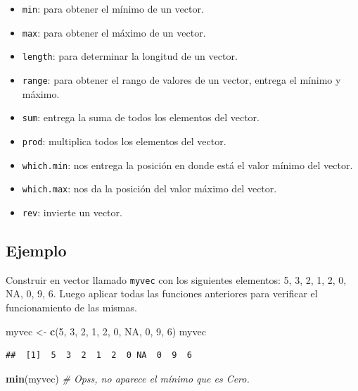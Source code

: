 \documentclass[10pt,]{krantz}
\makeatletter
\newenvironment{Shaded}{\begin{snugshade}}{\end{snugshade}}
\newcommand{\KeywordTok}[1]{\textcolor[rgb]{0.13,0.29,0.53}{\textbf{{#1}}}}
\newcommand{\DecValTok}[1]{\textcolor[rgb]{0.00,0.00,0.81}{{#1}}}
\newcommand{\StringTok}[1]{\textcolor[rgb]{0.31,0.60,0.02}{{#1}}}
\newcommand{\CommentTok}[1]{\textcolor[rgb]{0.56,0.35,0.01}{\textit{{#1}}}}
\newcommand{\OtherTok}[1]{\textcolor[rgb]{0.56,0.35,0.01}{{#1}}}
\newcommand{\NormalTok}[1]{{#1}}
\providecommand{\tightlist}{%
  \setlength{\itemsep}{0pt}\setlength{\parskip}{0pt}}
\newenvironment{kframe}{%
\medskip{}
\setlength{\fboxsep}{.8em}
 \def\at@end@of@kframe{}%
 \ifinner\ifhmode%
  \def\at@end@of@kframe{\end{minipage}}%
  \begin{minipage}{\columnwidth}%
 \fi\fi%
 \def\FrameCommand##1{\hskip\@totalleftmargin \hskip-\fboxsep
 \colorbox{shadecolor}{##1}\hskip-\fboxsep
     \hskip-\linewidth \hskip-\@totalleftmargin \hskip\columnwidth}%
 \MakeFramed {\advance\hsize-\width
   \@totalleftmargin\z@ \linewidth\hsize
   \@setminipage}}%
 {\par\unskip\endMakeFramed%
 \at@end@of@kframe}
\renewenvironment{Shaded}{\begin{kframe}}{\end{kframe}}
\makeatother
\begin{document}
\begin{itemize}
\tightlist
\item
  \texttt{min}: para obtener el mínimo de un vector.
\item
  \texttt{max}: para obtener el máximo de un vector.
\item
  \texttt{length}: para determinar la longitud de un vector.
\item
  \texttt{range}: para obtener el rango de valores de un vector, entrega
  el mínimo y máximo.
\item
  \texttt{sum}: entrega la suma de todos los elementos del vector.
\item
  \texttt{prod}: multiplica todos los elementos del vector.
\item
  \texttt{which.min}: nos entrega la posición en donde está el valor
  mínimo del vector.
\item
  \texttt{which.max}: nos da la posición del valor máximo del vector.
\item
  \texttt{rev}: invierte un vector.
\end{itemize}

\subsection*{Ejemplo}\label{ejemplo-2}


Construir en vector llamado \texttt{myvec} con los siguientes elementos:
5, 3, 2, 1, 2, 0, NA, 0, 9, 6. Luego aplicar todas las funciones
anteriores para verificar el funcionamiento de las mismas.

\begin{Shaded}
\begin{Highlighting}[]
\NormalTok{myvec <-}\StringTok{ }\KeywordTok{c}\NormalTok{(}\DecValTok{5}\NormalTok{, }\DecValTok{3}\NormalTok{, }\DecValTok{2}\NormalTok{, }\DecValTok{1}\NormalTok{, }\DecValTok{2}\NormalTok{, }\DecValTok{0}\NormalTok{, }\OtherTok{NA}\NormalTok{, }\DecValTok{0}\NormalTok{, }\DecValTok{9}\NormalTok{, }\DecValTok{6}\NormalTok{)}
\NormalTok{myvec}
\end{Highlighting}
\end{Shaded}

\begin{verbatim}
##  [1]  5  3  2  1  2  0 NA  0  9  6
\end{verbatim}

\begin{Shaded}
\begin{Highlighting}[]
\KeywordTok{min}\NormalTok{(myvec)  }\CommentTok{# Opss, no aparece el mínimo que es Cero.}
\end{Highlighting}
\end{Shaded}
\end{document}
